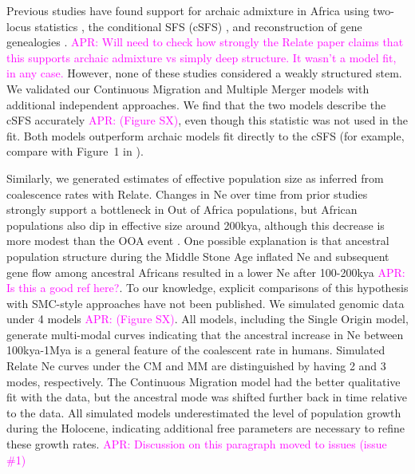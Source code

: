 \documentclass[]{article}
\newcommand{\aprcomment}[1]{{\textcolor{magenta}{APR: #1}}}
\begin{document}
Previous studies have found support for archaic admixture in Africa using
two-locus statistics \citep{Hsieh2016-gk,Ragsdale2019-nt}, the conditional SFS
(cSFS) \citep{Durvasula2020-td}, and reconstruction of gene genealogies
\citep{Speidel2019-nj}. \aprcomment{Will need to check how strongly the Relate
paper claims that this supports archaic admixture vs simply deep structure. It
wasn't a model fit, in any case.} However, none of these studies considered a
weakly structured stem. We validated our Continuous Migration and Multiple
Merger models with additional independent approaches. We find that the two
models describe the cSFS accurately \aprcomment{(Figure SX)}, even though this
statistic was not used in the fit.  Both models outperform archaic models fit
directly to the cSFS (for example, compare with Figure~1 in
\citet{Durvasula2020-td}).

Similarly, we generated estimates of effective population size as inferred from
coalescence rates with Relate. Changes in Ne over time from prior studies
strongly support a bottleneck in Out of Africa populations, but African
populations also dip in effective size around 200kya, although this decrease is
more modest than the OOA event \citep{Mallick2016-lx}. One possible explanation
is that ancestral population structure during the Middle Stone Age inflated Ne
and subsequent gene flow among ancestral Africans resulted in a lower Ne after
100-200kya \citep{Mazet2016-wn}\aprcomment{Is this a good ref here?}. To our
knowledge, explicit comparisons of this hypothesis with SMC-style approaches
have not been published. We simulated genomic data under 4 models
\aprcomment{(Figure SX)}. All models, including the Single Origin model,
generate multi-modal curves indicating that the ancestral increase in Ne
between 100kya-1Mya is a general feature of the coalescent rate in humans.
Simulated Relate Ne curves under the CM and MM are distinguished by having 2
and 3 modes, respectively. The Continuous Migration model had the better
qualitative fit with the data, but the ancestral mode was shifted further back
in time relative to the data. All simulated models underestimated the level of
population growth during the Holocene, indicating additional free parameters
are necessary to refine these growth rates. \aprcomment{Discussion on this
paragraph moved to issues (issue \#1)}
\end{document}
